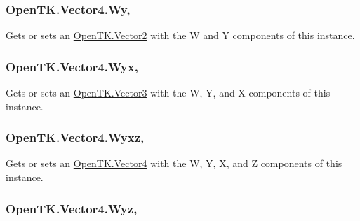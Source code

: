 \hypertarget{struct_open_t_k_1_1_vector4_ab3cccbcf54325d45c265fcc142fa5be0}{
\subsubsection[{Wy}]{ Open\-T\-K.\-Vector4.\-Wy\hspace{0.3cm}{\ttfamily [get]}, {\ttfamily [set]}}}\label{struct_open_t_k_1_1_vector4_ab3cccbcf54325d45c265fcc142fa5be0}


Gets or sets an \hyperlink{struct_open_t_k_1_1_vector2}{Open\-T\-K.\-Vector2} with the W and Y components of this instance. 

\hypertarget{struct_open_t_k_1_1_vector4_ae72bf98597020d5e0c9cb159b6336576}{
\subsubsection[{Wyx}]{ Open\-T\-K.\-Vector4.\-Wyx\hspace{0.3cm}{\ttfamily [get]}, {\ttfamily [set]}}}\label{struct_open_t_k_1_1_vector4_ae72bf98597020d5e0c9cb159b6336576}


Gets or sets an \hyperlink{struct_open_t_k_1_1_vector3}{Open\-T\-K.\-Vector3} with the W, Y, and X components of this instance. 

\hypertarget{struct_open_t_k_1_1_vector4_aed53a7c83d8dd97792f074f50df7ac8e}{
\subsubsection[{Wyxz}]{ Open\-T\-K.\-Vector4.\-Wyxz\hspace{0.3cm}{\ttfamily [get]}, {\ttfamily [set]}}}\label{struct_open_t_k_1_1_vector4_aed53a7c83d8dd97792f074f50df7ac8e}


Gets or sets an \hyperlink{struct_open_t_k_1_1_vector4}{Open\-T\-K.\-Vector4} with the W, Y, X, and Z components of this instance. 

\hypertarget{struct_open_t_k_1_1_vector4_af3823ed1d229208602c5596e991fb717}{
\subsubsection[{Wyz}]{ Open\-T\-K.\-Vector4.\-Wyz\hspace{0.3cm}{\ttfamily [get]}, {\ttfamily [set]}}}\label{struct_open_t_k_1_1_vector4_af3823ed1d229208602c5596e991fb717}


